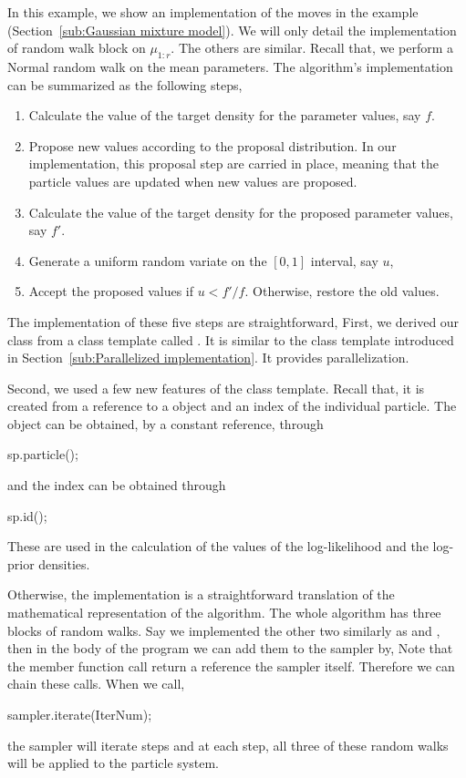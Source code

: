 In this example, we show an implementation of the \mcmc moves in the \gmm
example (Section~\ref{sub:Gaussian mixture model}). We will only detail the
implementation of random walk block on $\mu_{1:r}$. The others are similar.
Recall that, we perform a Normal random walk on the mean parameters. The \mcmc
algorithm's implementation can be summarized as the following steps,
\begin{enumerate}
  \item Calculate the value of the target density for the parameter values,
    say $f$.
  \item Propose new values according to the proposal distribution. In our
    implementation, this proposal step are carried in place, meaning that the
    particle values are updated when new values are proposed.
  \item Calculate the value of the target density for the proposed parameter
    values, say $f'$.
  \item Generate a uniform random variate on the $[0,1]$ interval, say $u$,
  \item Accept the proposed values if $u < f'/f$. Otherwise, restore the old
    values.
\end{enumerate}
The implementation of these five steps are straightforward,
First, we derived our class from a class template called .
It is similar to the  class template introduced in
Section~\ref{sub:Parallelized implementation}. It provides \openmp
parallelization.

Second, we used a few new features of the  class
template. Recall that, it is created from a reference to a
 object and an index of the individual particle. The
 object can be obtained, by a constant reference,
through
\begin{cppcode}
sp.particle();
\end{cppcode}
and the index can be obtained through
\begin{cppcode}
sp.id();
\end{cppcode}
These are used in the calculation of the values of the log-likelihood and the
log-prior densities.

Otherwise, the implementation is a straightforward translation of the
mathematical representation of the algorithm. The whole algorithm has three
blocks of random walks. Say we implemented the other two similarly as
 and , then in the body
of the program we can add them to the sampler by,
Note that the  member function call return a reference the
sampler itself. Therefore we can chain these calls. When we call,
\begin{cppcode}
sampler.iterate(IterNum);
\end{cppcode}
the sampler will iterate  steps and at each step, all three
of these random walks will be applied to the particle system.

